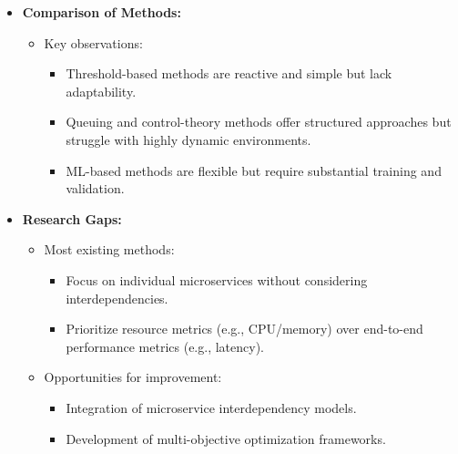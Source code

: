 \documentclass[conference]{IEEEtran}
\begin{document}
\begin{itemize}
    \item \textbf{Comparison of Methods:}
    \begin{itemize}
        \item Key observations:
        \begin{itemize}
            \item Threshold-based methods are reactive and simple but lack adaptability.
            \item Queuing and control-theory methods offer structured approaches but struggle with highly dynamic environments.
            \item ML-based methods are flexible but require substantial training and validation.
        \end{itemize}
    \end{itemize}
    
    \item \textbf{Research Gaps:}
    \begin{itemize}
        \item Most existing methods:
        \begin{itemize}
            \item Focus on individual microservices without considering interdependencies.
            \item Prioritize resource metrics (e.g., CPU/memory) over end-to-end performance metrics (e.g., latency).
        \end{itemize}
        \item Opportunities for improvement:
        \begin{itemize}
            \item Integration of microservice interdependency models.
            \item Development of multi-objective optimization frameworks.
        \end{itemize}
    \end{itemize}
\end{itemize}
\end{document}
